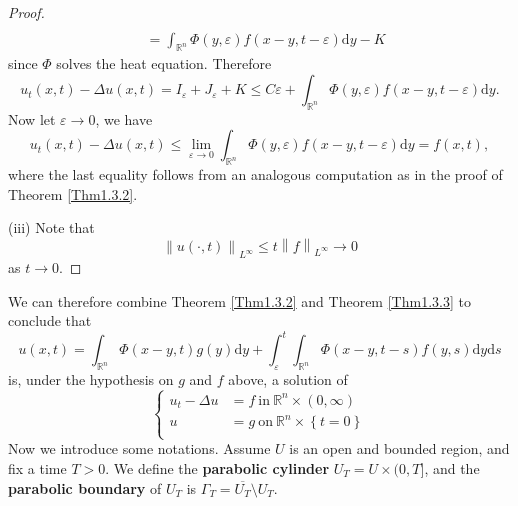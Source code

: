 \begin{proof}
$$\begin{aligned}
\\
&=\int_{\mathbb{R} ^n}{\Phi \left( y,\varepsilon \right) f\left( x-y,t-\varepsilon \right) \mathrm{d}y}-K
\end{aligned}
$$
since $\Phi$ solves the heat equation. Therefore 
$$
u_t\left( x,t \right) -\Delta u\left( x,t \right) =I_{\varepsilon}+J_{\varepsilon}+K\le C\varepsilon +\int_{\mathbb{R} ^n}{\Phi \left( y,\varepsilon \right) f\left( x-y,t-\varepsilon \right) \mathrm{d}y}.
$$
Now let $\varepsilon\to 0$, we have 
$$
u_t\left( x,t \right) -\Delta u\left( x,t \right) \le \lim_{\varepsilon \rightarrow 0} \int_{\mathbb{R} ^n}{\Phi \left( y,\varepsilon \right) f\left( x-y,t-\varepsilon \right) \mathrm{d}y}=f\left( x,t \right) ,
$$
where the last equality follows from an analogous computation as in the proof of Theorem \ref{Thm1.3.2}.\par
(iii) Note that 
$$
\left\| u\left( \cdot ,t \right) \right\| _{L^{\infty}}\le t\left\| f \right\| _{L^{\infty}}\rightarrow 0
$$
as $t\to 0$.
\end{proof}
We can therefore combine Theorem \ref{Thm1.3.2} and Theorem \ref{Thm1.3.3} to conclude that 
\begin{equation}\label{1.33}
u\left( x,t \right) =\int_{\mathbb{R} ^n}{\Phi \left( x-y,t \right) g\left( y \right) \mathrm{d}y}+\int_{\varepsilon}^t{\int_{\mathbb{R} ^n}{\Phi \left( x-y,t-s \right) f\left( y,s \right) \mathrm{d}y}\mathrm{d}s}
\end{equation}
is, under the hypothesis on $g$ and $f$ above, a solution of 
\begin{equation}\label{1.34}
\left\{ \begin{aligned}
	u_t-\Delta u&=f\ \text{in}\ \mathbb{R} ^n\times \left( 0,\infty \right)\\
	u&=g\ \text{on}\ \mathbb{R} ^n\times \left\{ t=0 \right\}\\
\end{aligned} \right. 
\end{equation}
Now we introduce some notations. Assume $U$ is an open and bounded region, and fix a time $T>0$. We define the \textbf{parabolic cylinder} $U_T=U\times(0,T]$, and the \textbf{parabolic boundary} of $U_T$ is $\Gamma_T=\overline{U_T}\setminus U_T$.
